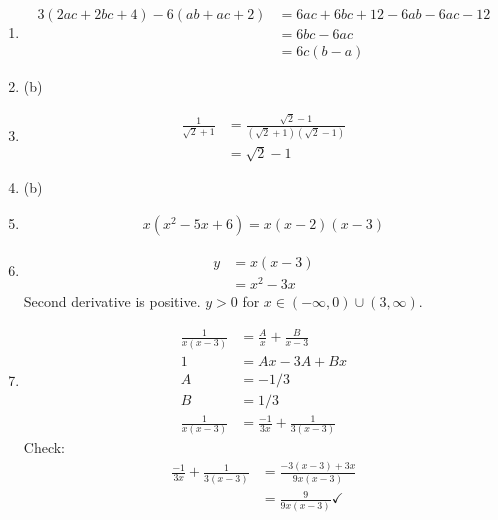 \begin{enumerate}
\item
\begin{align*}
  3(2ac + 2bc + 4) - 6(ab + ac + 2)
  &= 6ac + 6bc + 12 - 6ab -6ac -12 \\
  &= 6bc - 6ac \\
  &= 6c(b-a)
\end{align*}
\item (b)
\item
 \begin{align*}
    \frac{1}{\sqrt{2} + 1}
   &= \frac{\sqrt{2} - 1}{(\sqrt{2} + 1)(\sqrt{2} - 1)} \\
   &= \sqrt{2} - 1
 \end{align*}
\item (b)
\item
\begin{align*}
  x(x^2 - 5x + 6) = x(x-2)(x-3)
\end{align*}
\item \begin{align*}
        y &= x(x - 3) \\
          &= x^2 - 3x
      \end{align*}
      Second derivative is positive.
      $y > 0$ for $x \in (-\infty, 0) \cup (3, \infty)$.
\item \begin{align*}
        \frac{1}{x(x - 3)} &= \frac{A}{x} + \frac{B}{x-3} \\
        1                  &= Ax - 3A + Bx \\
        A &= -1/3 \\
        B &= 1/3 \\
        \frac{1}{x(x - 3)} &= \frac{-1}{3x} + \frac{1}{3(x - 3)}
      \end{align*}
      Check:
      \begin{align*}
        \frac{-1}{3x} + \frac{1}{3(x - 3)}
        &= \frac{-3(x - 3) + 3x}{9x(x - 3)} \\
        &= \frac{9}{9x(x - 3)} \checkmark
      \end{align*}




\end{enumerate}
